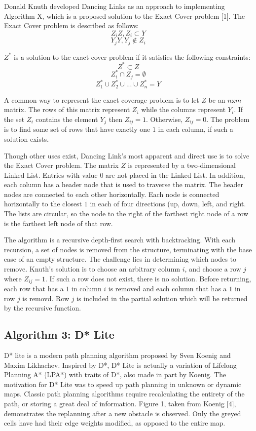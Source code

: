 \documentclass[11pt]{article}
\begin{document}
Donald Knuth developed Dancing Links as an approach to implementing Algorithm X, which is a proposed solution to the Exact Cover problem [1]. The Exact Cover problem is described as follows:
$$Z_iZ, Z_i \subset Y$$
$$Y_jY, Y_j \notin Z_i$$

$Z^{\ast}$ is a solution to the exact cover problem if it satisfies the following constraints:
$$Z^{\ast} \subset Z$$
$$Z_{i}^{\ast} \cap Z_{j} = \emptyset $$
$$Z_{1}^{\ast} \cup Z_{2}^{\ast} \cup ... \cup Z_{n}^{\ast} = Y$$

A common way to represent the exact coverage problem is to let $Z$ be an $n$x$m$ matrix. The rows of this matrix represent $Z_i$ while the columns represent $Y_i$. If the set $Z_i$ contains the element $Y_j$ then $Z_{ij}=1$. Otherwise, $Z_{ij}=0$. The problem is to find some set of rows that have exactly one $1$ in each column, if such a solution exists.

Though other uses exist, Dancing Link's most apparent and direct use is to solve the Exact Cover problem. The matrix $Z$ is represented by a two-dimensional Linked List. Entries with value $0$ are not placed in the Linked List. In addition, each column has a header node that is used to traverse the matrix. The header nodes are connected to each other horizontally. Each node is connected horizontally to the closest $1$ in each of four directions (up, down, left, and right. The lists are circular, so the node to the right of the farthest right node of a row is the farthest left node of that row.

The algorithm is a recursive depth-first search with backtracking. With each recursion, a set of nodes is removed from the structure, terminating with the base case of an empty structure. The challenge lies in determining which nodes to remove. Knuth's solution is to choose an arbitrary column $i$, and choose a row $j$ where $Z_{ij}=1$. If such a row does not exist, there is no solution. Before returning, each row that has a $1$ in column $i$ is removed and each column that has a $1$ in row $j$ is removd. Row $j$ is included in the partial solution which will be returned by the recursive function.

\subsection*{Algorithm 3: D* Lite}

D* lite is a modern path planning algorithm proposed by Sven Koenig and Maxim Likhachev. Inspired by D*, D* Lite is actually a variation of Lifelong Planning A* (LPA*) with traits of D*, also made in part by Koenig. The motivation for D* Lite was to speed up path planning in unknown or dynamic maps. Classic path planning algorithms require recalculating the entirety of the path, or storing a great deal of information. Figure 1, taken from Koenig [4], demonstrates the replanning after a new obstacle is observed. Only the greyed cells have had their edge weights modified, as opposed to the entire map.
\end{document}
